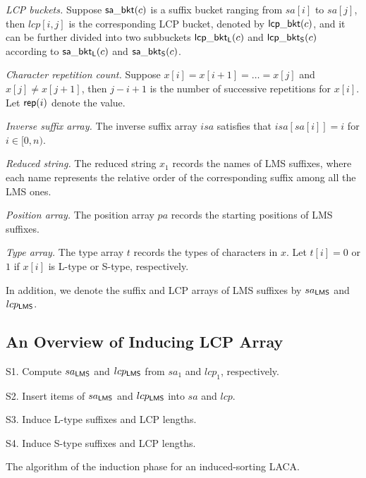 \documentclass[10pt,journal,compsoc]{IEEEtran}
\begin{document}
	{\em LCP buckets.} Suppose ${\sf sa\_bkt}(c)$ is a suffix bucket ranging from $sa[i]$ to $sa[j]$, then $lcp[i, j]$ is the corresponding LCP bucket, denoted by ${\sf lcp\_bkt}(c)$, and it can be further divided into two subbuckets ${\sf lcp\_bkt_L}(c)$ and ${\sf lcp\_bkt_S}(c)$ according to ${\sf sa\_bkt_L}(c)$ and ${\sf sa\_bkt_S}(c)$.
	
	{\em Character repetition count.} Suppose $x[i] = x[i + 1] = \dots = x[j]$ and $x[j] \ne x[j + 1]$, then $j - i + 1$ is the number of successive repetitions for $x[i]$. Let ${\sf rep}(i)$ denote the value.
	
	
	{\em Inverse suffix array.} The inverse suffix array $isa$ satisfies that $isa[sa[i]] = i$ for $i \in [0, n)$.
	
	{\em Reduced string.} The reduced string $x_1$ records the names of LMS suffixes, where each name represents the relative order of the corresponding suffix among all the LMS ones.
	
	{\em Position array.} The position array $pa$ records the starting positions of LMS suffixes.	
	
	{\em Type array.} The type array $t$ records the types of characters in $x$. Let $t[i] = 0$ or $1$ if $x[i]$ is L-type or S-type, respectively.
	
	In addition, we denote the suffix and LCP arrays of LMS suffixes by $sa_{\sf LMS}$ and $lcp_{\sf LMS}$.
	
	\subsection{An Overview of Inducing LCP Array} \label{sec:method2:overview}
	
	\begin{algorithm*}
		
		\SetAlgoNoLine
		
		
		
		S1. Compute $sa_{\sf LMS}$ and $lcp_{\sf LMS}$ from $sa_1$ and $lcp_1$, respectively.
		
		S2. Insert items of $sa_{\sf LMS}$ and $lcp_{\sf LMS}$ into $sa$ and $lcp$. \label{alg:2:step:1}
		
		S3. Induce L-type suffixes and LCP lengths.
		
		S4. Induce S-type suffixes and LCP lengths.
		
		\caption{The algorithm of the induction phase for an induced-sorting LACA.}
		
		\label{alg:2}
		
	\end{algorithm*}
	
\end{document}
